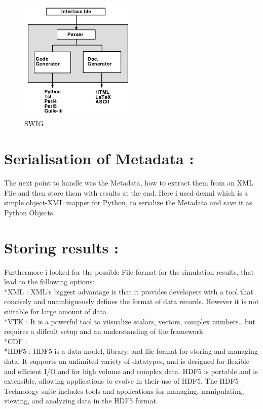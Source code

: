 \begin{figure}[htb]
  \centering
  \includegraphics[width=0.5\textwidth]{figures/swig}
  \caption{SWIG}
  \label{fig:swig}
\end{figure}
\section{Serialisation of Metadata :}
The next point to handle was the Metadata, how to extract them from an XML File and then store them with results at the end. Here i used dexml which is a simple object-XML mapper for Python, to serialize the Metadata and save it as Python Objects.\\
\section{Storing results :}
Furthermore i looked for the possible File format for the simulation results, that lead to the following options:\\
*XML : XML's biggest advantage is that it provides developers with a tool that concisely and unambiguously defines the format of data records. However it is not suitable for large amount of data.\\
*VTK : It is a powerful tool to viisualize scalars, vectors, complex numbers.. but  requires a diffcult setup and an understanding of the framework.\\
*CDF : \\
*HDF5 : HDF5 is a data model, library, and file format for storing and managing data. It supports an unlimited variety of datatypes, and is designed for flexible and efficient I/O and for high volume and complex data. HDF5 is portable and is extensible, allowing applications to evolve in their use of HDF5. The HDF5 Technology suite includes tools and applications for managing, manipulating, viewing, and analyzing data in the HDF5 format. \\ 
